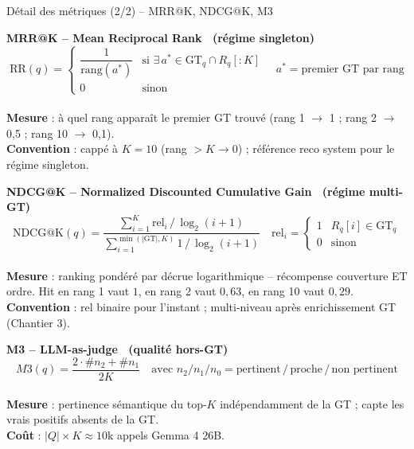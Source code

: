\documentclass[aspectratio=169,10pt]{beamer}
\begin{document}
\begin{frame}{Détail des métriques (2/2) -- MRR@K, NDCG@K, M3}
  \footnotesize

  \textbf{\color{ok}MRR@K -- Mean Reciprocal Rank \ (régime singleton)}
  \vspace{-0.2em}
  \[
    \mathrm{RR}(q) =
    \begin{cases}
      \dfrac{1}{\mathrm{rang}(a^*)} & \text{si } \exists\, a^* \in \mathrm{GT}_q \cap R_q[{:}K] \\[0.3em]
      0 & \text{sinon}
    \end{cases}
    \quad a^* = \text{premier GT par rang}
  \]
  \vspace{-0.6em} \\
  \textbf{Mesure} : à quel rang apparaît le premier GT trouvé (rang 1 $\to$ 1 ; rang 2 $\to$ 0,5 ; rang 10 $\to$ 0,1). \\
  \textbf{Convention} : cappé à $K{=}10$ (rang $>K \to 0$) ; référence reco system pour le régime singleton.

  \vspace{0.3em}\hrulefill\vspace{0.2em}

  \textbf{\color{ok}NDCG@K -- Normalized Discounted Cumulative Gain \ (régime multi-GT)}
  \vspace{-0.2em}
  \[
    \mathrm{NDCG@K}(q) = \frac{\sum_{i=1}^{K} \mathrm{rel}_i \,/\, \log_2(i{+}1)}
                              {\sum_{i=1}^{\min(|\mathrm{GT}|,K)} 1 \,/\, \log_2(i{+}1)}
    \quad \mathrm{rel}_i =
    \begin{cases} 1 & R_q[i]\in\mathrm{GT}_q \\ 0 & \text{sinon} \end{cases}
  \]
  \vspace{-0.6em} \\
  \textbf{Mesure} : ranking pondéré par décrue logarithmique -- récompense couverture ET ordre. Hit en rang 1 vaut $1$, en rang 2 vaut $0{,}63$, en rang 10 vaut $0{,}29$. \\
  \textbf{Convention} : rel binaire pour l'instant ; multi-niveau après enrichissement GT (Chantier 3).

  \vspace{0.3em}\hrulefill\vspace{0.2em}

  \textbf{\color{crosscol}M3 -- LLM-as-judge \ (qualité hors-GT)}
  \vspace{-0.2em}
  \[
    M3(q) = \frac{2\cdot \#n_2 + \#n_1}{2K}
    \quad\text{avec } n_2 / n_1 / n_0 = \text{pertinent} \,/\, \text{proche} \,/\, \text{non pertinent}
  \]
  \vspace{-0.6em} \\
  \textbf{Mesure} : pertinence sémantique du top-$K$ indépendamment de la GT ; capte les vrais positifs absents de la GT. \\
  \textbf{Coût} : $|Q|\!\times\!K\approx 10\mathrm{k}$ appels Gemma 4 26B.
\end{frame}
\end{document}
